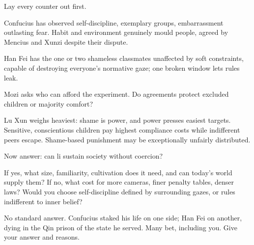 Lay every counter out first.

Confucius has observed self-discipline, exemplary groups, embarrassment outlasting fear. Habit and environment genuinely mould people, agreed by Mencius and Xunzi despite their dispute.

Han Fei has the one or two shameless classmates unaffected by soft constraints, capable of destroying everyone's normative gaze; one broken window lets rules leak.

Mozi asks who can afford the experiment. Do agreements protect excluded children or majority comfort?

Lu Xun weighs heaviest: shame is power, and power presses easiest targets. Sensitive, conscientious children pay highest compliance costs while indifferent peers escape. Shame-based punishment may be exceptionally unfairly distributed.

Now answer: can li sustain society without coercion?

If yes, what size, familiarity, cultivation does it need, and can today's world supply them? If no, what cost for more cameras, finer penalty tables, denser laws? Would you choose self-discipline defined by surrounding gazes, or rules indifferent to inner belief?

No standard answer. Confucius staked his life on one side; Han Fei on another, dying in the Qin prison of the state he served. Many bet, including you. Give your answer and reasons.
